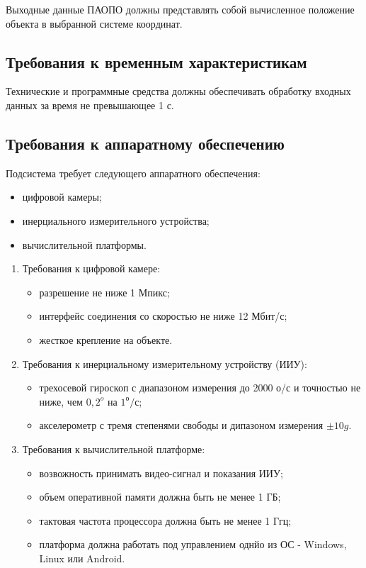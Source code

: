 \documentclass
[a4paper,14pt,russian]{article}
\begin{document}
Выходные данные ПАОПО должны представлять собой вычисленное положение объекта в выбранной системе координат.

\subsection{Требования к временным характеристикам}
Технические и программные средства должны обеспечивать обработку входных данных за время не превышающее 1 с.

\subsection{Требования к аппаратному обеспечению}
Подсистема требует следующего аппаратного обеспечения:
\begin{itemize}
\item цифровой камеры;
\item инерциального измерительного устройства;
\item вычислительной платформы.
\end{itemize}

\begin{enumerate}
\item Требования к цифровой камере:
	\begin{itemize}
	\item разрешение не ниже 1 Мпикс;
 	\item интерфейс соединения со скоростью не ниже 12 Мбит/с;
	\item жесткое крепление на объекте.
	\end{itemize}
\item Требования к инерциальному измерительному устройству (ИИУ):
	\begin{itemize}
	\item трехосевой гироскоп с диапазоном измерения до 2000 о/с и точностью не ниже, чем $0,2^{o}$ на $1 ^{о}/с$;
\item акселерометр с тремя степенями свободы и дипазоном измерения $\pm10g$. 
	\end{itemize}
\item Требования к вычислительной платформе:
	\begin{itemize}
	\item возвожность принимать видео-сигнал и показания ИИУ;
	\item объем оперативной памяти должна быть не менее 1 ГБ;
	\item тактовая частота процессора должна быть не менее 1 Ггц;
	\item платформа должна работать под управлением однйо из ОС -  Windows, Linux или Android.
	\end{itemize}
\end{enumerate}
\end{document}
